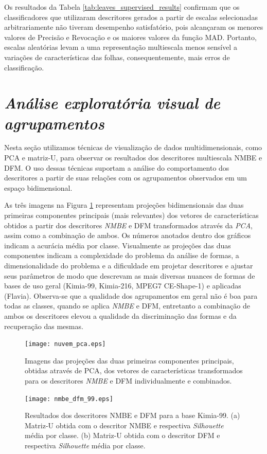 Os resultados da Tabela \ref{tab:leaves_supervised_results} confirmam que os classificadores que utilizaram descritores gerados a partir de escalas selecionadas arbitrariamente não tiveram desempenho satisfatório, pois alcançaram os menores valores de Precisão e Revocação e os maiores valores da função MAD. Portanto, escalas aleatórias levam a uma representação multiescala menos sensível a variações de características das folhas, consequentemente, mais erros de classificação. 

\section{\emph{Análise exploratória visual de agrupamentos}}

Nesta seção utilizamos técnicas de visualização de dados multidimensionais, como PCA e matriz-U, para observar os resultados dos descritores multiescala NMBE e DFM. O uso dessas técnicas suportam a análise do comportamento dos descritores a partir de suas relações com os agrupamentos observados em um espaço bidimensional. 

As três imagens na Figura \ref{fig:nuvem_pca} representam projeções bidimensionais das duas primeiras componentes principais (mais relevantes) dos vetores de características obtidos a partir dos descritores \emph{NMBE} e DFM transformados através da \emph{PCA}, assim como a combinação de ambos. Os números anotados dentro dos gráficos indicam a acurácia média por classe. Visualmente as projeções das duas componentes indicam a complexidade do problema da análise de formas, a dimensionalidade do problema e a dificuldade em projetar descritores e ajustar seus parâmetros de modo que descrevam as mais diversas nuances de formas de bases de uso geral (Kimia-99, Kimia-216, MPEG7 CE-Shape-1) e aplicadas (Flavia). Observa-se que a qualidade dos agrupamentos em geral não é boa para todas as classes, quando se aplica \emph{NMBE} e DFM, entretanto a combinação de ambos os descritores elevou a qualidade da discriminação das formas e da recuperação das mesmas.  

\begin{figure}[t]
  \caption{\label{fig:nuvem_pca} Imagens das projeções das duas primeiras componentes principais, obtidas através de PCA, dos vetores de características transformados para os descritores \emph{NMBE} e  DFM individualmente e combinados.}
  \centering
  \texttt{[image: nuvem\_pca.eps]}
\end{figure}

\begin{figure}[t]
 \caption{\label{fig:nmbe_dfm_99} Resultados dos descritores NMBE e DFM para a base Kimia-99. (a) Matriz-U obtida com o descritor NMBE e respectiva \textit{Silhouette} média por classe. (b) Matriz-U obtida com o descritor DFM e respectiva \textit{Silhouette} média por classe.}
  \centering
  \texttt{[image: nmbe\_dfm\_99.eps]}
\end{figure}


